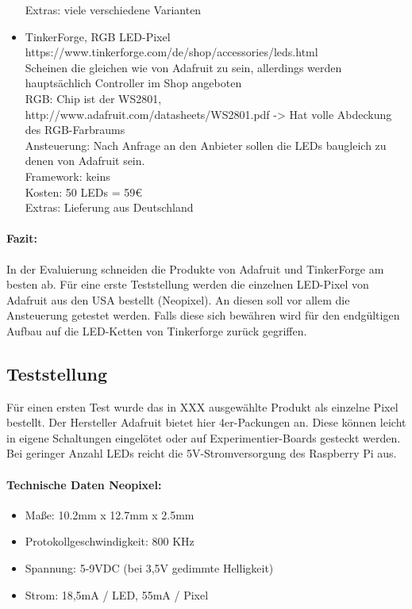 \begin{itemize}
Extras: viele verschiedene Varianten
\item TinkerForge, RGB LED-Pixel \\
https://www.tinkerforge.com/de/shop/accessories/leds.html \\
Scheinen die gleichen wie von Adafruit zu sein, allerdings werden hauptsächlich Controller im Shop angeboten \\
RGB: Chip ist der WS2801, http://www.adafruit.com/datasheets/WS2801.pdf -> Hat volle Abdeckung des RGB-Farbraums \\
Ansteuerung: Nach Anfrage an den Anbieter sollen die LEDs baugleich zu denen von Adafruit sein.  \\
Framework: keins \\
Kosten: 50 LEDs = 59€ \\
Extras: Lieferung aus Deutschland
\end{itemize}
\paragraph{Fazit:}
In der Evaluierung schneiden die Produkte von Adafruit und TinkerForge am besten ab. Für eine erste Teststellung werden die einzelnen LED-Pixel von Adafruit aus den USA bestellt (Neopixel). An diesen soll vor allem die Ansteuerung getestet werden. Falls diese sich bewähren wird für den endgültigen Aufbau auf die LED-Ketten von Tinkerforge zurück gegriffen. 

\subsection{Teststellung}
Für einen ersten Test wurde das in XXX ausgewählte Produkt als einzelne Pixel bestellt. Der Hersteller Adafruit bietet hier 4er-Packungen an. Diese können leicht in eigene Schaltungen eingelötet oder auf Experimentier-Boards gesteckt werden. Bei geringer Anzahl LEDs reicht die 5V-Stromversorgung des Raspberry Pi aus. 
\paragraph{Technische Daten Neopixel:} 
	\begin{itemize}
	\item Maße: 10.2mm x 12.7mm x 2.5mm
	\item Protokollgeschwindigkeit: 800 KHz
	\item Spannung: 5-9VDC  (bei 3,5V gedimmte Helligkeit) 
	\item Strom: 18,5mA / LED, 55mA / Pixel
	\end{itemize}
